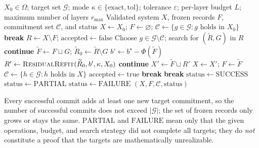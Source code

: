 \documentclass[11pt,a4paper]{article}
\numberwithin{equation}{section}
\theoremstyle{definition}
\numberwithin{algorithm}{section}
\begin{document}
\begin{algorithm}[H]
\small
\caption{Recursive directed construction of prescribed higher-order structures}
\label{alg:directed}
\begin{algorithmic}[1]
\Require $X_0\in\Omega$; target set $\mathcal G$; mode
$\kappa\in\{\mathrm{exact},\mathrm{tol}\}$; tolerance $\varepsilon$;
per-layer budget $L$; maximum number of layers $r_{\max}$
\Ensure Validated system $X$, frozen records $F$, commitment set $\mathcal C$, and status
\State $X\gets X_0$; $F\gets\varnothing$;
$\mathcal C\gets\{g\in\mathcal G:g\text{ holds in }X_0\}$
    \State \textbf{break}
  \EndIf
  \State $R\gets X\setminus F$; $\mathrm{accepted}\gets\mathrm{false}$
    \State Choose $g\in\mathcal G\setminus\mathcal C$;
           search for $(\widetilde R,G)$ in $R$
      \State \textbf{continue}
    \EndIf
    \State $\widetilde F\gets F\sqcup G$;
           $\widetilde R_0\gets\widetilde R\setminus G$
    \State $b'\gets b^\star-\Phi(\widetilde F)$
    \State $R'\gets\Call{ResidualRefit}{\widetilde R_0,b',\kappa,X_0}$
      \State \textbf{continue}
    \EndIf
    \State $X'\gets\widetilde F\sqcup R'$
      \State $X\gets X'$; $F\gets\widetilde F$
      \State $\mathcal C\gets\{h\in\mathcal G:h\text{ holds in }X\}$
      \State $\mathrm{accepted}\gets\mathrm{true}$ 
      \State \textbf{break}
    \EndIf
  \EndFor
    \State \textbf{break}
  \EndIf
\EndFor
{}
  \State $\mathrm{status}\gets\mathrm{SUCCESS}$
  \State $\mathrm{status}\gets\mathrm{PARTIAL}$
\Else
  \State $\mathrm{status}\gets\mathrm{FAILURE}$
\EndIf
\State \Return $(X,F,\mathcal C,\mathrm{status})$
\end{algorithmic}
\end{algorithm}

Every successful commit adds at least one new target commitment, so the number of successful
commits does not exceed $|\mathcal G|$; the set of frozen records only grows or stays the
same.
$\mathrm{PARTIAL}$ and $\mathrm{FAILURE}$ mean only that the given operations, budget, and
search strategy did not complete all targets; they do \emph{not} constitute a proof that the
targets are mathematically unrealizable.
\end{document}

